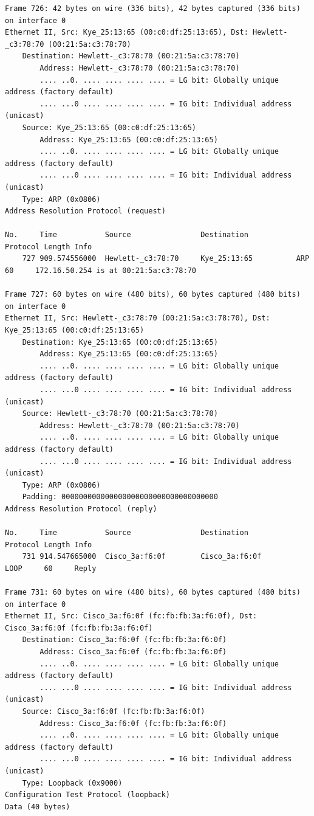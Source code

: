 \documentclass[a4paper,11pt]{article}
\begin{document}
\begin{lstlisting}
Frame 726: 42 bytes on wire (336 bits), 42 bytes captured (336 bits) on interface 0
Ethernet II, Src: Kye_25:13:65 (00:c0:df:25:13:65), Dst: Hewlett-_c3:78:70 (00:21:5a:c3:78:70)
    Destination: Hewlett-_c3:78:70 (00:21:5a:c3:78:70)
        Address: Hewlett-_c3:78:70 (00:21:5a:c3:78:70)
        .... ..0. .... .... .... .... = LG bit: Globally unique address (factory default)
        .... ...0 .... .... .... .... = IG bit: Individual address (unicast)
    Source: Kye_25:13:65 (00:c0:df:25:13:65)
        Address: Kye_25:13:65 (00:c0:df:25:13:65)
        .... ..0. .... .... .... .... = LG bit: Globally unique address (factory default)
        .... ...0 .... .... .... .... = IG bit: Individual address (unicast)
    Type: ARP (0x0806)
Address Resolution Protocol (request)

No.     Time           Source                Destination           Protocol Length Info
    727 909.574556000  Hewlett-_c3:78:70     Kye_25:13:65          ARP      60     172.16.50.254 is at 00:21:5a:c3:78:70

Frame 727: 60 bytes on wire (480 bits), 60 bytes captured (480 bits) on interface 0
Ethernet II, Src: Hewlett-_c3:78:70 (00:21:5a:c3:78:70), Dst: Kye_25:13:65 (00:c0:df:25:13:65)
    Destination: Kye_25:13:65 (00:c0:df:25:13:65)
        Address: Kye_25:13:65 (00:c0:df:25:13:65)
        .... ..0. .... .... .... .... = LG bit: Globally unique address (factory default)
        .... ...0 .... .... .... .... = IG bit: Individual address (unicast)
    Source: Hewlett-_c3:78:70 (00:21:5a:c3:78:70)
        Address: Hewlett-_c3:78:70 (00:21:5a:c3:78:70)
        .... ..0. .... .... .... .... = LG bit: Globally unique address (factory default)
        .... ...0 .... .... .... .... = IG bit: Individual address (unicast)
    Type: ARP (0x0806)
    Padding: 000000000000000000000000000000000000
Address Resolution Protocol (reply)

No.     Time           Source                Destination           Protocol Length Info
    731 914.547665000  Cisco_3a:f6:0f        Cisco_3a:f6:0f        LOOP     60     Reply

Frame 731: 60 bytes on wire (480 bits), 60 bytes captured (480 bits) on interface 0
Ethernet II, Src: Cisco_3a:f6:0f (fc:fb:fb:3a:f6:0f), Dst: Cisco_3a:f6:0f (fc:fb:fb:3a:f6:0f)
    Destination: Cisco_3a:f6:0f (fc:fb:fb:3a:f6:0f)
        Address: Cisco_3a:f6:0f (fc:fb:fb:3a:f6:0f)
        .... ..0. .... .... .... .... = LG bit: Globally unique address (factory default)
        .... ...0 .... .... .... .... = IG bit: Individual address (unicast)
    Source: Cisco_3a:f6:0f (fc:fb:fb:3a:f6:0f)
        Address: Cisco_3a:f6:0f (fc:fb:fb:3a:f6:0f)
        .... ..0. .... .... .... .... = LG bit: Globally unique address (factory default)
        .... ...0 .... .... .... .... = IG bit: Individual address (unicast)
    Type: Loopback (0x9000)
Configuration Test Protocol (loopback)
Data (40 bytes)


\end{lstlisting}
\end{document}

